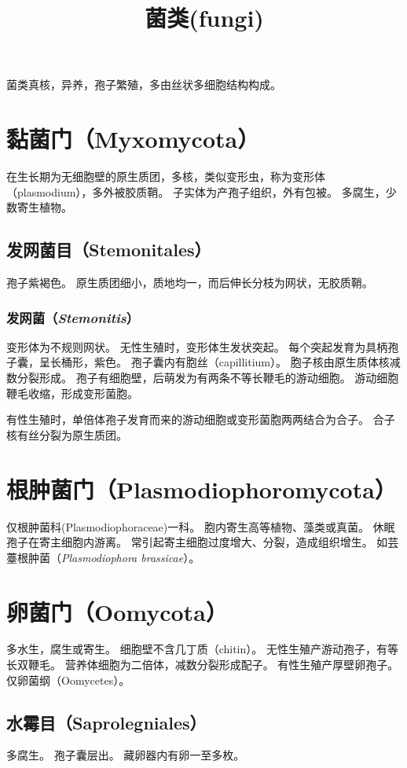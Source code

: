 \documentclass[11pt]{article}
\title{菌类(fungi)}
\date{}
\begin{document}
  \maketitle

  \linenumbers
菌类真核，异养，孢子繁殖，多由丝状多细胞结构构成。

\section{黏菌门（Myxomycota）}
在生长期为无细胞壁的原生质团，多核，类似变形虫，称为变形体（plasmodium），多外被胶质鞘。
子实体为产孢子组织，外有包被。
多腐生，少数寄生植物。

\subsection{发网菌目（Stemonitales）}
孢子紫褐色。
原生质团细小，质地均一，而后伸长分枝为网状，无胶质鞘。


\subsubsection{发网菌（\textit{Stemonitis}）}
变形体为不规则网状。
无性生殖时，变形体生发状突起。
每个突起发育为具柄孢子囊，呈长桶形，紫色。
孢子囊内有胞丝（capillitium）。
胞子核由原生质体核减数分裂形成。
孢子有细胞壁，后萌发为有两条不等长鞭毛的游动细胞。
游动细胞鞭毛收缩，形成变形菌胞。

\newline

有性生殖时，单倍体孢子发育而来的游动细胞或变形菌胞两两结合为合子。
合子核有丝分裂为原生质团。

\section{根肿菌门（Plasmodiophoromycota）}
仅根肿菌科(Plasmodiophoraceae)一科。
胞内寄生高等植物、藻类或真菌。
休眠孢子在寄主细胞内游离。
常引起寄主细胞过度增大、分裂，造成组织增生。
如芸薹根肿菌（\textit{Plasmodiophora brassicae}）。

\section{卵菌门（Oomycota）}
多水生，腐生或寄生。
细胞壁不含几丁质（chitin）。
无性生殖产游动孢子，有等长双鞭毛。
营养体细胞为二倍体，减数分裂形成配子。
有性生殖产厚壁卵孢子。
仅卵菌纲（Oomycetes）。

\subsection{水霉目（Saprolegniales）}
多腐生。
孢子囊层出。
藏卵器内有卵一至多枚。
\end{document}
